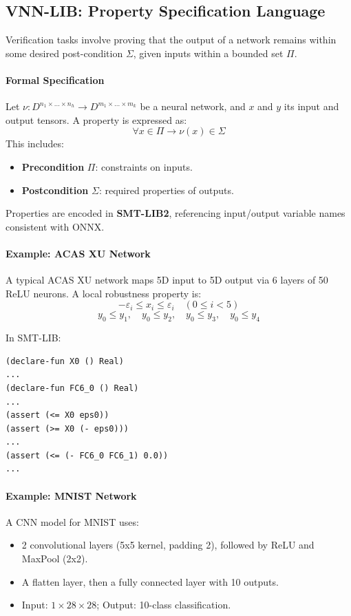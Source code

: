 \documentclass[oneside,11pt,dvipsnames]{book}
\begin{document}
\subsection{VNN-LIB: Property Specification Language}

Verification tasks involve proving that the output of a network remains within some desired post-condition $\Sigma$, given inputs within a bounded set $\Pi$.

\paragraph{Formal Specification}
Let $\nu: D^{n_1 \times \dots \times n_h} \to D^{m_1 \times \dots \times m_k}$ be a neural network, and $x$ and $y$ its input and output tensors. A property is expressed as:
\[
\forall x \in \Pi \rightarrow \nu(x) \in \Sigma
\]
This includes:
\begin{itemize}
    \item \textbf{Precondition} $\Pi$: constraints on inputs.
    \item \textbf{Postcondition} $\Sigma$: required properties of outputs.
\end{itemize}

Properties are encoded in \textbf{SMT-LIB2}, referencing input/output variable names consistent with ONNX.


\paragraph{Example: ACAS XU Network}

A typical ACAS XU network maps 5D input to 5D output via 6 layers of 50 ReLU neurons. A local robustness property is:
\[
-\varepsilon_i \leq x_i \leq \varepsilon_i \quad (0 \leq i < 5)
\]
\[
y_0 \leq y_1, \quad y_0 \leq y_2, \quad y_0 \leq y_3, \quad y_0 \leq y_4
\]

\noindent In SMT-LIB:
\begin{lstlisting}
(declare-fun X0 () Real)
...
(declare-fun FC6_0 () Real)
...
(assert (<= X0 eps0))
(assert (>= X0 (- eps0)))
...
(assert (<= (- FC6_0 FC6_1) 0.0))
...
\end{lstlisting}

\paragraph{Example: MNIST Network}

A CNN model for MNIST uses:
\begin{itemize}
    \item 2 convolutional layers (5x5 kernel, padding 2), followed by ReLU and MaxPool (2x2).
    \item A flatten layer, then a fully connected layer with 10 outputs.
    \item Input: $1 \times 28 \times 28$; Output: 10-class classification.
\end{itemize}
\end{document}
